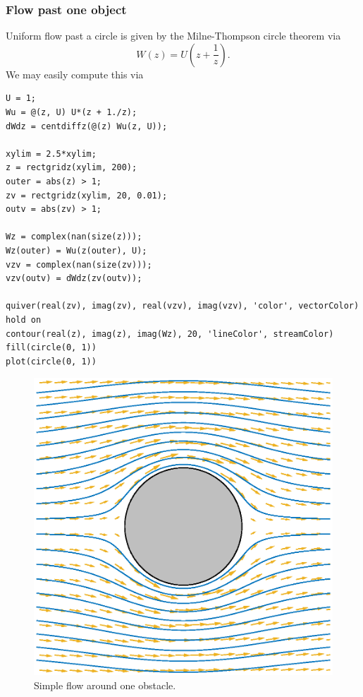 \documentclass[12pt,fleqn]{article}
\begin{document}
\subsubsection{Flow past one object}
Uniform flow past a circle is given by the Milne-Thompson circle theorem via
\begin{equation*}
  W(z) = U\left( z + \frac{1}{z} \right).
\end{equation*}
We may easily compute this via
\begin{lstlisting}
U = 1;
Wu = @(z, U) U*(z + 1./z);
dWdz = centdiffz(@(z) Wu(z, U));

xylim = 2.5*xylim;
z = rectgridz(xylim, 200);
outer = abs(z) > 1;
zv = rectgridz(xylim, 20, 0.01);
outv = abs(zv) > 1;

Wz = complex(nan(size(z)));
Wz(outer) = Wu(z(outer), U);
vzv = complex(nan(size(zv)));
vzv(outv) = dWdz(zv(outv));

quiver(real(zv), imag(zv), real(vzv), imag(vzv), 'color', vectorColor)
hold on
contour(real(z), imag(z), imag(Wz), 20, 'lineColor', streamColor)
fill(circle(0, 1))
plot(circle(0, 1))
\end{lstlisting}
\begin{figure}[htb]
  \centering
  \includegraphics[height=.4\textheight]{figures/aroundone}
  \caption{Simple flow around one obstacle.}
  \label{fig:aroundone}
\end{figure}
\end{document}

